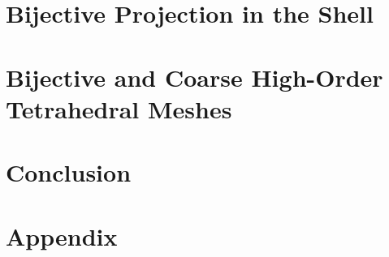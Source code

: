 \documentclass[12pt,oneside,letterpaper]{report}
\begin{document}
% 
\lipsum

\chapter{Bijective Projection in the Shell}
\label{chp-proof}








\chapter{Bijective and Coarse High-Order Tetrahedral Meshes}


\chapter{Conclusion}
\label{chp-conclusion}

% 


% 
%
%
%
%



\appendix

\chapter{Appendix}

% 
\lipsum




\cleardoublepage
{}




\end{document}
